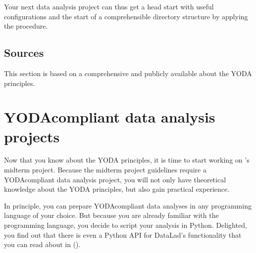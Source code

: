 \sphinxAtStartPar
Your next data analysis project can thus get a head start with useful configurations
and the start of a comprehensible directory structure by applying the  procedure.


\subsection{Sources}
\label{\detokenize{basics/101-127-yoda:sources}}
\sphinxAtStartPar
This section is based on a comprehensive
 and publicly
available  about the
YODA principles.

\sphinxstepscope


\section{YODA\sphinxhyphen{}compliant data analysis projects}
\label{\detokenize{basics/101-130-yodaproject:yoda-compliant-data-analysis-projects}}\label{\detokenize{basics/101-130-yodaproject:yoda-project}}\label{\detokenize{basics/101-130-yodaproject::doc}}
\sphinxAtStartPar
Now that you know about the YODA principles, it is time to start working on
’s midterm project. Because the midterm project guidelines
require a YODA\sphinxhyphen{}compliant data analysis project, you will not only have theoretical
knowledge about the YODA principles, but also gain practical experience.

\sphinxAtStartPar
In principle, you can prepare YODA\sphinxhyphen{}compliant data analyses in any programming
language of your choice. But because you are already familiar with
the  programming language, you decide
to script your analysis in Python. Delighted, you find out that there is even
a Python API for DataLad’s functionality that you can read about in {\hyperref[\detokenize{basics/101-130-yodaproject:fom-pythonapi}]{}} ().

